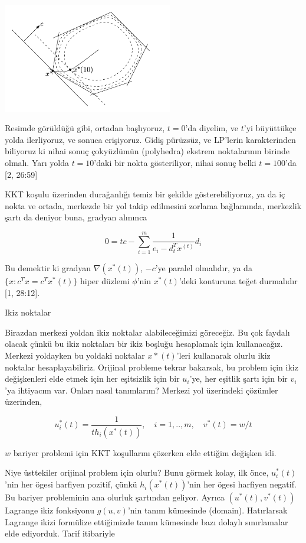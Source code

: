 \documentclass[12pt,fleqn]{article}\usepackage{../../common}
\begin{document}
\includegraphics[width=20em]{func_59_barr_03.png}

Resimde görüldüğü gibi, ortadan başlıyoruz, $t=0$'da diyelim, ve $t$'yi
büyüttükçe yolda ilerliyoruz, ve sonuca erişiyoruz. Gidiş pürüzsüz, ve
LP'lerin karakterinden biliyoruz ki nihai sonuç çokyüzlümün (polyhedra)
ekstrem noktalarının birinde olmalı. Yarı yolda $t=10$'daki bir nokta
gösteriliyor, nihai sonuç belki $t=100$'da [2, 26:59]

KKT koşulu üzerinden durağanlığı temiz bir şekilde gösterebiliyoruz, ya da
iç nokta ve ortada, merkezde bir yol takip edilmesini zorlama bağlamında,
merkezlik şartı da deniyor buna, gradyan alınınca

$$
0 = tc - \sum _{i=1}^{m} \frac{1}{e_i - d_t ^T x^(t)} d_i
$$

Bu demektir ki gradyan $\nabla (x^*(t))$, $-c$'ye paralel olmalıdır, ya da
$\{ x: c^T x = c^T x^*(t) \}$ hiper düzlemi $\phi$'nin $x^*(t)$'deki
konturuna teğet durmalıdır [1, 28:12].

Ikiz noktalar

Birazdan merkezi yoldan ikiz noktalar alabileceğimizi göreceğiz. Bu çok
faydalı olacak çünkü bu ikiz noktaları bir ikiz boşluğu hesaplamak için
kullanacağız. Merkezi yoldayken bu yoldaki noktalar $x*(t)$'leri
kullanarak olurlu ikiz noktalar hesaplayabiliriz. Orijinal probleme
tekrar bakarsak, bu problem için ikiz değişkenleri elde etmek için her
eşitsizlik için bir $u_i$'ye, her eşitlik şartı için bir $v_i$'ya ihtiyacım
var. Onları nasıl tanımlarım? Merkezi yol üzerindeki çözümler üzerinden,

$$
u_i^*(t) = \frac{1}{t h_i(x^*(t))}, \quad i=1,..,m, \quad v^*(t) = w/t
$$

$w$ bariyer problemi için KKT koşullarını çözerken elde ettiğim değişken
idi. 

Niye üsttekiler orijinal problem için olurlu? Bunu görmek kolay, ilk önce,
$u_i^*(t)$'nin her ögesi harfiyen pozitif, çünkü $h_i(x^*(t))$'nin her
ögesi harfiyen negatif. Bu bariyer probleminin ana olurluk şartından
geliyor. Ayrıca $(u^*(t),v^*(t))$ Lagrange ikiz fonksiyonu $g(u,v)$'nin
tanım kümesinde (domain). Hatırlarsak Lagrange ikizi formülize ettiğimizde
tanım kümesinde bazı dolaylı sınırlamalar elde ediyorduk. Tarif itibariyle
\end{document}
